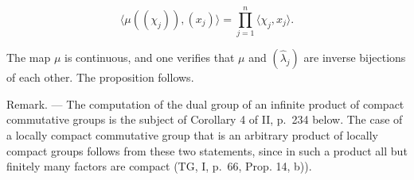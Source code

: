 \[
\langle \mu ((\chi_ {j})), (x _ {j}) \rangle = \prod_ {j = 1} ^ {n} \langle \chi_ {j}, x _ {j} \rangle .
\]

The map \(\mu\) is continuous, and one verifies that \(\mu\) and \((\widehat{\lambda}_j)\) are inverse bijections of each other. The proposition follows.

Remark. --- The computation of the dual group of an infinite product of compact commutative groups is the subject of Corollary 4 of II, p.~234 below. The case of a locally compact commutative group that is an arbitrary product of locally compact groups follows from these two statements, since in such a product all but finitely many factors are compact (TG, I, p.~66, Prop. 14, b)).

